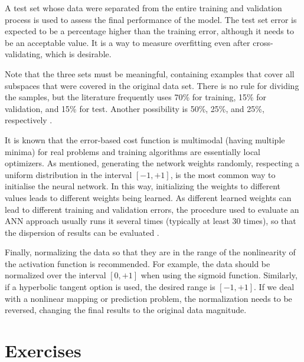 A test set whose data were separated from the entire training and validation process is used to assess the final performance of the model. The test set error is expected to be a percentage higher than the training error, although it needs to be an acceptable value. It is a way to measure overfitting even after cross-validating, which is desirable. 

Note that the three sets must be meaningful, containing examples that cover all subspaces that were covered in the original data set. There is no rule for dividing the samples, but the literature frequently uses 70\% for training, 15\% for validation, and 15\% for test. Another possibility is 50\%, 25\%, and 25\%, respectively \cite{haykin}.

It is known that the error-based cost function is multimodal (having multiple minima) for real problems and training algorithms are essentially local optimizers. As mentioned, generating the network weights randomly, respecting a uniform distribution in the interval $[-1,+1]$, is the most common way to initialise the neural network. In this way, initializing the weights to different values leads to different weights being learned. As different learned weights can lead to different training and validation errors, the procedure used to evaluate an ANN approach usually runs it several times (typically at least 30 times), so that the dispersion of results can be evaluated \cite{demvsar2006statistical}. 

Finally, normalizing the data so that they are in the range of the nonlinearity of the activation function is recommended. For example, the data should be normalized over the interval $[0,+1]$ when using the sigmoid function. Similarly, if a hyperbolic tangent option is used, the desired range is $[-1,+1]$. If we deal with a nonlinear mapping or prediction problem, the normalization needs to be reversed, changing the final results to the original data magnitude.

\section{Exercises}
\label{ssec:exercises}

